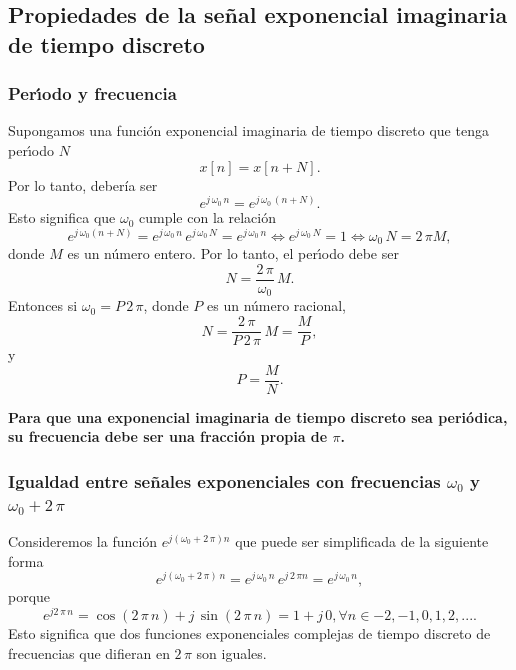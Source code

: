\subsection{Propiedades de la se\~{n}al exponencial imaginaria de tiempo discreto}

\subsubsection{Per\'{\i}odo y frecuencia}

Supongamos una funci\'{o}n exponencial imaginaria de tiempo discreto que
tenga per\'{\i}odo $N$
\begin{equation}
 x[n] = x[n + N].
\end{equation}
Por lo tanto, debería ser
\begin{equation}
 e^{j \, \omega_{0} \, n} = e^{j \, \omega_{0} \, (n + N)}.
\end{equation}
Esto significa que $\omega_{0}$ cumple con la relaci\'{o}n
\begin{equation}
  e^{j \, \omega_{0}\left( n+N\right) }=
  e^{j \, \omega_{0} \, n} \, e^{j \, \omega_{0} \, N}=e^{j \, \omega_{0} \, n}
  \Leftrightarrow e^{j \, \omega_{0} \, N}=1\Leftrightarrow\omega_{0} \, N=2 \, \pi M,
\end{equation}
donde $M$ es un n\'{u}mero entero. 
Por lo tanto, el per\'{\i}odo debe ser
\begin{equation}
  N =\frac{2 \, \pi }{\omega_{0}} \, M.
\end{equation}
Entonces si $\omega_{0} = P \, 2 \, \pi$, donde $P$ es un número racional,
\begin{equation}
  N =\frac{2 \, \pi }{P \, 2 \, \pi} \, M = \frac{M}{P},
\end{equation}
y
\begin{equation}
  P = \frac{M}{N}.
\end{equation}

\textbf{Para que una exponencial imaginaria de tiempo discreto sea
  peri\'{o}dica, su frecuencia debe ser una fracci\'{o}n propia de
  $\pi$.}

\subsubsection{Igualdad entre se\~{n}ales exponenciales con frecuencias $\omega_{0}$ y $\omega_{0}+2 \, \pi $}

Consideremos la funci\'{o}n $e^{j\left( \omega_{0}+2 \, \pi \right) n}$
que puede ser simplificada de la siguiente forma
\begin{equation}
  e^{j\left( \omega_{0}+2 \, \pi \right) \, n} = 
  e^{j \, \omega_{0} \, n} \, e^{j \, 2 \, \pi n} = 
  e^{j \, \omega_{0} \, n},
\end{equation}
porque
\begin{equation}
  e^{j2 \, \pi \, n}=
  \cos \left( 2 \, \pi \, n\right) +j \, \sin \left(2 \, \pi \, n\right) = 1+j \, 0, \forall n \in -2,-1,0,1,2,....
\end{equation}
Esto significa que dos funciones exponenciales complejas de tiempo discreto de frecuencias que difieran en $2 \, \pi $ son iguales.

